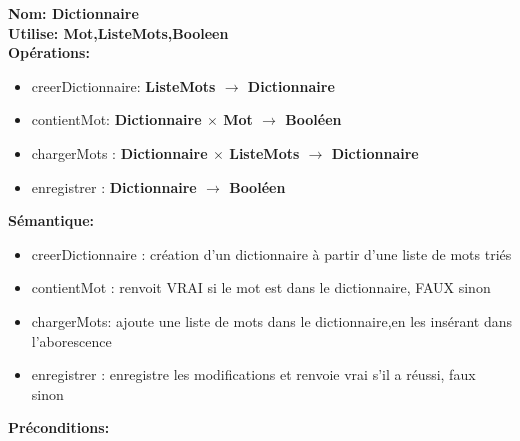 \documentclass{article}
\begin{document}
    \noindent
    \textbf{Nom: Dictionnaire}\\
    \textbf{Utilise: Mot,ListeMots,Booleen} \\
    \textbf{Opérations:} \begin{itemize}[label=$\ $, leftmargin=2cm, itemsep=0cm]
        \item creerDictionnaire: \textbf{ListeMots $\rightarrow $ Dictionnaire}
        \item contientMot: \textbf{Dictionnaire $\times$ Mot $\rightarrow $ Booléen}
        \item chargerMots : \textbf{Dictionnaire $\times$ ListeMots $ \rightarrow$ Dictionnaire}
        \item enregistrer : \textbf{Dictionnaire $\rightarrow$ Booléen}
        
    \end{itemize}
    
    \textbf{Sémantique: }\begin{itemize}[label=$\- $, leftmargin=2cm, itemsep=0cm]
        \item creerDictionnaire : création d’un dictionnaire à partir d’une liste de mots triés
        \item contientMot : renvoit VRAI si le mot est dans le dictionnaire, FAUX sinon
        \item chargerMots: ajoute une liste de mots dans le dictionnaire,en les insérant dans l'aborescence
        \item enregistrer : enregistre les modifications et renvoie vrai s'il a réussi, faux sinon
    \end{itemize}

    \textbf{Préconditions:} \begin{itemize}[label=$\- $, leftmargin=2cm, itemsep=0cm]
    \end{itemize}
\end{document}
